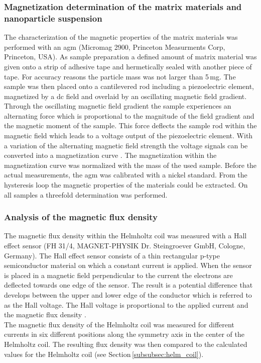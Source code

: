 \subsubsection{Magnetization determination of the matrix materials and nanoparticle suspension}
\label{subsubsec:Mag_char}
The characterization of the magnetic properties of the matrix materials was performed with an \gls{agm} (Micromag 2900, Princeton Measurments Corp, Princeton, USA). As sample preparation a defined amount of matrix material was given onto a strip of adhesive tape and hermetically sealed with another piece of tape. For accuracy reasons the particle mass was not larger than 5\,mg. The sample was then placed onto a cantilevered rod including a piezoelectric element, magnetized by a dc field and overlaid by an oscillating magnetic field gradient. Through the  oscillating magnetic field gradient the sample experiences an alternating force  which is proportional to the magnitude of the field gradient and the magnetic moment of the sample. This force deflects the sample rod within the magnetic field which leads to a voltage output of the piezoelectric element. With a variation of the alternating magnetic field strength the voltage signals can be converted into a magnetization curve \cite{flanders1988alternating}. The magnetization within the magnetization curve was normalized with the mass of the used sample. Before the actual measurements, the \gls{agm} was calibrated with a nickel standard. From the hysteresis loop the magnetic properties of the materials could be extracted. On all samples a threefold determination was performed.    

\subsubsection{Analysis of the magnetic flux density}
\label{subsubsec:Hall_eff}
The magnetic flux density within the Helmholtz coil was measured with a Hall effect sensor (FH 31/4, MAGNET-PHYSIK Dr. Steingroever GmbH, Cologne, Germany). The Hall effect sensor consists of a thin rectangular p-type semiconductor material on which a constant current is applied. When the sensor is placed in a magnetic field perpendicular to the current the electrons are deflected towards one edge of the sensor. The result is a potential difference that develops between the upper and lower edge of the conductor which is referred to as the Hall voltage. The Hall voltage is proportional to the applied current and the magnetic flux density \cite{svoboda2004magnetic}.\\%
The magnetic flux density of the Helmholtz coil was measured for different currents in six different positions along the symmetry axis in the center of the Helmholtz coil. The resulting flux density was then compared to the calculated values for the Helmholtz coil (see Section\,\ref{subsubsec:helm_coil}). 



